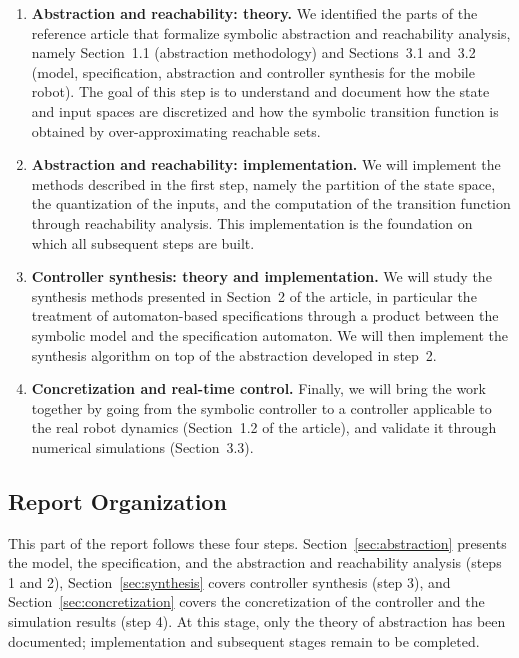 \documentclass[11pt,a4paper]{article}
\begin{document}
\begin{enumerate}
  \item \textbf{Abstraction and reachability: theory.} We identified the parts of the
  reference article that formalize symbolic abstraction and reachability analysis, namely
  Section~1.1 (abstraction methodology) and Sections~3.1 and~3.2 (model, specification,
  abstraction and controller synthesis for the mobile robot). The goal of this step is to
  understand and document how the state and input spaces are discretized and how the
  symbolic transition function is obtained by over-approximating reachable sets.

  \item \textbf{Abstraction and reachability: implementation.} We will implement the methods
  described in the first step, namely the partition of the state space, the quantization of
  the inputs, and the computation of the transition function through reachability analysis.
  This implementation is the foundation on which all subsequent steps are built.

  \item \textbf{Controller synthesis: theory and implementation.} We will study the synthesis
  methods presented in Section~2 of the article, in particular the treatment of
  automaton-based specifications through a product between the symbolic model and the
  specification automaton. We will then implement the synthesis algorithm on top of the
  abstraction developed in step~2.

  \item \textbf{Concretization and real-time control.} Finally, we will bring the work together
  by going from the symbolic controller to a controller applicable to the real robot
  dynamics (Section~1.2 of the article), and validate it through numerical simulations
  (Section~3.3).
\end{enumerate}

\subsection{Report Organization}

This part of the report follows these four steps. Section~\ref{sec:abstraction} presents
the model, the specification, and the abstraction and reachability analysis (steps 1 and 2),
Section~\ref{sec:synthesis} covers controller synthesis (step 3), and
Section~\ref{sec:concretization} covers the concretization of the controller and the
simulation results (step 4). At this stage, only the theory of abstraction
has been documented; implementation and subsequent stages remain to be completed.
\end{document}
